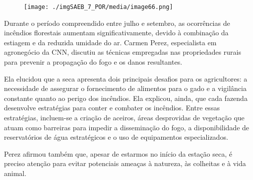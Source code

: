 \begin{myquote}




\begin{figure}[H]
\centering
\texttt{[image: ./imgSAEB\_7\_POR/media/image66.png]}
\end{figure}

Durante o período compreendido entre julho e setembro, as ocorrências de
incêndios florestais aumentam significativamente, devido à combinação da
estiagem e da reduzida umidade do ar. Carmen Perez, especialista em
agronegócio da CNN, discutiu as técnicas empregadas nas propriedades rurais
para prevenir a propagação do fogo e os danos resultantes.

Ela elucidou que a seca apresenta dois principais desafios para os
agricultores: a necessidade de assegurar o fornecimento de alimentos para o
gado e a vigilância constante quanto ao perigo dos incêndios. Ela explicou,
ainda, que cada fazenda desenvolve estratégias para conter e combater
os incêndios. Entre essas estratégias, incluem-se a criação de aceiros, áreas
desprovidas de vegetação que atuam como barreiras para impedir a disseminação
do fogo, a disponibilidade de reservatórios de água estratégicos e o uso de
equipamentos especializados.

Perez afirmou também que, apesar de estarmos no início da estação seca, é preciso atenção
para evitar potenciais ameaças à natureza, às colheitas e à vida animal.


\end{myquote}

